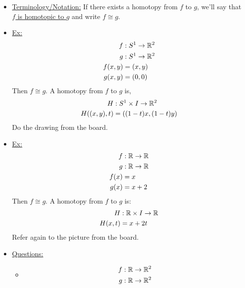 \documentclass[../notes.tex]{subfiles}
\begin{document}
    \begin{itemize}
        \item \underline{Terminology/Notation:} If there exists a homotopy from
            $f$ to $g$, we'll say that \underline{$f$ is homotopic to $g$} and write
            $f\cong g$.\\
        \item \underline{Ex:}
            \begin{align*}
                f&: S^{1}\rightarrow \mathbb{R}^2\\
                g&: S^{1}\rightarrow \mathbb{R}^2\\
                f(x,y)&=(x,y)\\
                g(x,y)&=(0,0)\\
            \end{align*}
            Then $f\cong g$. A homotopy from $f$ to $g$ is,
            \begin{align*}
                H&: S^{1}\times I \rightarrow \mathbb{R}^2\\
                H((x,y),t)&=((1-t)x,(1-t)y)\\
            \end{align*}
            Do the drawing from the board.
        \item \underline{Ex:}
            \begin{align*}
                f&:\mathbb{R} \rightarrow \mathbb{R}\\
                g&:\mathbb{R} \rightarrow \mathbb{R}\\
                f(x)&=x\\
                g(x)&=x+2\\
            \end{align*}
            Then $f\cong g$. A homotopy from $f$ to $g$ is:
            \begin{align*}
                H&:\mathbb{R} \times I \rightarrow \mathbb{R}\\
                H(x,t)&=x+2t\\
            \end{align*}
            Refer again to the picture from the board.
            \newpage
        \item \underline{Questions:}
            \begin{itemize}
                \item
                    \begin{align*}
                        f&: \R \rightarrow \R^2\\
                        g&: \R \rightarrow \R^2\\

\end{align*}
\end{itemize}
\end{itemize}
\end{document}
